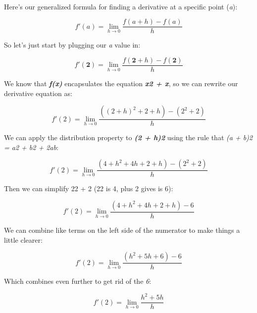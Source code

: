 \documentclass[11pt]{article}
\begin{document}
    \begin{center}
    \end{center}
    { \hspace*{\fill} \\}
    
    Here's our generalized formula for finding a derivative at a specific
point (\emph{a}):

\begin{equation}f'(a) = \lim_{h \to 0} \frac{f(a + h) - f(a)}{h} \end{equation}

So let's just start by plugging our \emph{a} value in:

\begin{equation}f'(\textbf{2}) = \lim_{h \to 0} \frac{f(\textbf{2} + h) - f(\textbf{2})}{h} \end{equation}

We know that \textbf{\emph{f(x)}} encapsulates the equation
\textbf{\emph{x2 + x}}, so we can rewrite our derivative equation as:

\begin{equation}f'(2) = \lim_{h \to 0} \frac{((2+h)^{2} + 2 + h) - (2^{2} + 2)}{h} \end{equation}

We can apply the distribution property to \textbf{\emph{(2 + h)2}} using
the rule that \emph{(a + b)2 = a2 + b2 + 2ab}:

\begin{equation}f'(2) = \lim_{h \to 0} \frac{(4 + h^{2} + 4h + 2 + h) - (2^{2} + 2)}{h} \end{equation}

Then we can simplify 22 + 2 (22 is 4, plus 2 gives is 6):

\begin{equation}f'(2) = \lim_{h \to 0} \frac{(4 + h^{2} + 4h + 2 + h) - 6}{h} \end{equation}

We can combine like terms on the left side of the numerator to make
things a little clearer:

\begin{equation}f'(2) = \lim_{h \to 0} \frac{(h^{2} + 5h + 6) - 6}{h} \end{equation}

Which combines even further to get rid of the \emph{6}:

\begin{equation}f'(2) = \lim_{h \to 0} \frac{h^{2} + 5h}{h} \end{equation}
\end{document}
